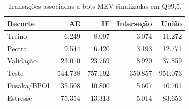 \begin{table}[htbp]
\centering\small
\caption{Transações associadas a bots MEV sinalizadas em Q99,5.}
\label{tab:mev-bot}
\begin{tabular}{@{}lrrrr@{}}
\toprule
Recorte & AE & IF & Interseção & União \\
\midrule
Treino & 6.249 & 8.097 & 3.074 & 11.272 \\
Pectra & 9.544 & 6.420 & 3.193 & 12.771 \\
Validação & 23.010 & 23.769 & 8.920 & 37.859 \\
Teste & 544.738 & 757.192 & 350.857 & 951.073 \\
Fusaka/BPO1 & 35.508 & 10.800 & 5.607 & 40.701 \\
Estresse & 75.354 & 13.313 & 5.014 & 83.653 \\
\bottomrule
\end{tabular}
\end{table}
